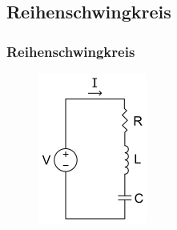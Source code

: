 \subsection*{Reihen\-schwing\-kreis}
\begin{frame}
  \frametitle{Reihenschwingkreis}
  \begin{center}
    \begin{minipage}{0.5\textwidth}
      \begin{figure}
        \includegraphics[height=.45\textheight,width=\textwidth,keepaspectratio]{a04/Serirenschw.png}
      \end{figure}
    \end{minipage}
    \begin{minipage}{0.49\textwidth}
      \begin{figure}

\end{figure}
\end{minipage}
\end{center}
\end{frame}
